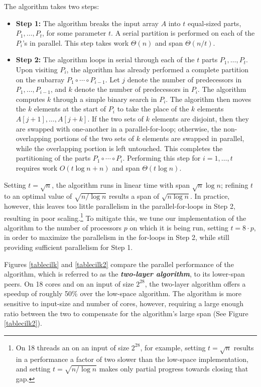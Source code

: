 \documentclass[sigconf]{acmart}
\newcommand{\defn}[1]       {{\textit{\textbf{\boldmath #1}}}}
\theoremstyle{remark}
\theoremstyle{remark}
\begin{document}
The algorithm takes two steps:
\begin{itemize}
\item \textbf{Step 1:} The algorithm breaks the input array $A$ into
  $t$ equal-sized parts, $P_1, \ldots, P_t$, for some parameter $t$. A
  serial partition is performed on each of the $P_i$'s in
  parallel. This step takes work $\Theta(n)$ and span $\Theta(n / t)$.
\item \textbf{Step 2:} The algorithm loops in serial through each of
  the $t$ parts $P_1, \ldots, P_t$. Upon visiting $P_i$, the algorithm
  has already performed a complete partition on the subarray $P_1
  \circ \cdots \circ P_{i - 1}$. Let $j$ denote the number of
  predecessors in $P_1, \ldots, P_{i - 1}$, and $k$ denote the number
  of predecessors in $P_i$. The algorithm computes $k$ through a
  simple binary search in $P_i$. The algorithm then moves the $k$
  elements at the start of $P_i$ to take the place of the $k$ elements
  $A[j + 1], \ldots, A[j + k]$. If the two sets of $k$ elements are
  disjoint, then they are swapped with one-another in a
  parallel-for-loop; otherwise, the non-overlapping portions of the
  two sets of $k$ elements are swapped in parallel, while the
  overlapping portion is left untouched. This completes the
  partitioning of the parts $P_1 \circ \cdots \circ P_i$. Performing
  this step for $i = 1, \ldots, t$ requires work $O(t \log n + n)$ and
  span $\Theta(t \log n)$.
\end{itemize}

Setting $t = \sqrt{n}$, the algorithm runs in linear time with span
$\sqrt{n} \log n$; refining $t$ to an optimal value of $\sqrt{n / \log
  n}$ results a span of $\sqrt{n \log n}$. In practice,
however, this leaves too little parallelism in the parallel-for-loops
in Step 2, resulting in poor scaling.\footnote{On 18 threads an on an
  input of size $2^{28}$, for example, setting $t = \sqrt{n}$ results
  in a performance a factor of two slower than the low-space
  implementation, and setting $t = \sqrt{n / \log n}$ makes only
  partial progress towards closing that gap.} To mitigate this, we
tune our implementation of the algorithm to the number of processors
$p$ on which it is being run, setting $t = 8 \cdot p$, in order to
maximize the parallelism in the for-loops in Step 2, while still
providing sufficient parallelism for Step 1.

Figures \ref{tablecilk} and \ref{tablecilk2} compare the parallel
performance of the algorithm, which is referred to as the
\defn{two-layer algorithm}, to its lower-span peers. On 18 cores and
on an input of size $2^{28}$, the two-layer algorithm offers a speedup of
roughly 50\% over the low-space algorithm. The algorithm is more
sensitive to input-size and number of cores, however, requiring a
large enough ratio between the two to compensate for the algorithm's
large span (See Figure \ref{tablecilk2}).
\end{document}
